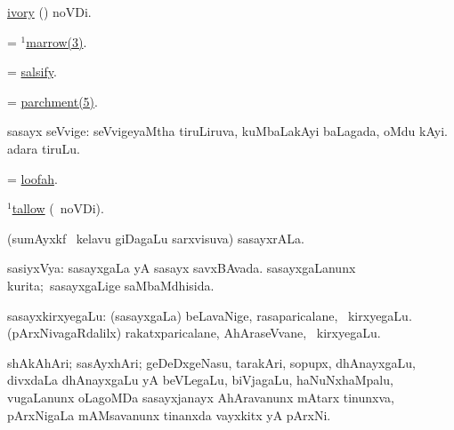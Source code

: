\bentry
{}
\gl{\nA}
\expl{}
\bmng
\hyperref{kandict_i.pdf}{I}{ivory pagu}{ivory} (\pagu) noVDi. 
\emng
\eentry

\bentry
{}
\gl{\nA}
\expl{}
\bmng
 = \hyperref{kandict_m.pdf}{M}{marrow(1)3}{$^1$marrow(3)}. 
\emng
\eentry

\bentry
{}
\gl{\nA}
\expl{}
\bmng
 = \hyperref{kandict_s.pdf}{S}{salsify}{salsify}.
\emng
\eentry

\bentry
{}
\gl{\nA}
\expl{}
\bmng
 = \hyperref{kandict_p.pdf}{P}{parchment(5)}{parchment(5)}. 
\emng
\eentry

\bentry
{}
\gl{\nA}
\expl{}
\bmng
 sasayx seVvige: 
\banum
{} seVvigeyaMtha tiruLiruva, kuMbaLakAyi baLagada, oMdu kAyi. 
 adara tiruLu. 
\eanum
\emng
\eentry

\bentry
{}
\gl{\nA}
\bmng
= \hyperref{kandict_l.pdf}{L}{loofah}{loofah}. 
\emng
\eentry

\bentry
{}
\gl{\nA}
\expl{}
\bmng
\hyperref{kandict_t.pdf}{T}{tallow(1)}{$^1$tallow} (\pagu\ noVDi). 
\emng
\eentry

\bentry
{}
\gl{\nA}
\expl{}
\bmng
 (sumAyxkf \mo\ kelavu giDagaLu sarxvisuva) sasayxrALa. 
\emng
\eentry

\bentry
{}
\gl{\gu}
\expl{}
\bmng
 sasiyxVya: 
\banum
{} sasayxgaLa yA sasayx savxBAvada. 
 sasayxgaLanunx kurita;~sasayxgaLige saMbaMdhisida. 
\eanum
\emng

\noindent 
\gl{\pagu}
\expl{}
\bmng
  sasayxkirxyegaLu: 
\banum
{} (sasayxgaLa) beLavaNige, rasaparicalane, \mo\ kirxyegaLu. 
 (pArxNivagaRdalilx) rakatxparicalane, AhAraseVvane, \mo\ kirxyegaLu. 
\eanum
\emng
\eentry

\bentry
{} 
\gl{\nA}
\expl{}
\bmng
shAkAhAri; sasAyxhAri; geDeDxgeNasu, tarakAri, sopupx, dhAnayxgaLu, divxdaLa dhAnayxgaLu yA beVLegaLu, biVjagaLu, haNuNxhaMpalu, \mo vugaLanunx oLagoMDa sasayxjanayx AhAravanunx mAtarx tinunxva, pArxNigaLa mAMsavanunx tinanxda vayxkitx yA pArxNi. 
\emng
\eentry

